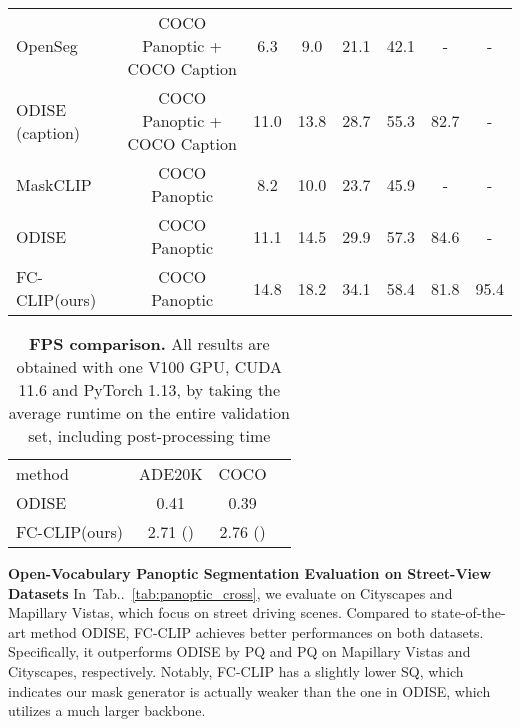 \documentclass{article}
\makeatletter
\DeclareRobustCommand\onedot{\futurelet\@let@token\@onedot}
\def\@onedot{\ifx\@let@token.\else.\null\fi\xspace}
\newcommand{\tabref}[1]{Tab\onedot~\ref{#1}}
\newcommand{\modelname}{FC-CLIP\xspace}
\newcommand{\tablestyle}[2]{\setlength{\tabcolsep}{#1}\renewcommand{\arraystretch}{#2}\centering\footnotesize}
\makeatother
\begin{document}
\begin{table*}[!t]
\begin{tabular}{l|c|cccccc}
\hline
OpenSeg~\cite{ghiasi2022scaling}      & COCO Panoptic + COCO Caption          & 6.3           & 9.0           & 21.1          & 42.1          & -         & -       \\
ODISE~\cite{xu2023open} (caption)        & COCO Panoptic + COCO Caption      & 11.0 & 13.8 & 28.7 & 55.3 & 82.7   & -  \\
\hline
MaskCLIP~\cite{ding2022open}       & COCO Panoptic              & 8.2           & 10.0          & 23.7          & 45.9          & -         & -     \\
ODISE~\cite{xu2023open}        & COCO Panoptic            & 11.1 & 14.5 & 29.9 & 57.3 & 84.6   & -  \\
\hline \hline
\modelname (ours)        & COCO Panoptic      & 14.8 & 18.2 & 34.1 & 58.4 & 81.8   & 95.4  \\
\end{tabular}

\end{table*}


\begin{table}[!t]
\tablestyle{6pt}{1.1}
\caption{
\textbf{FPS comparison.} All results are obtained with one V100 GPU, CUDA 11.6 and PyTorch 1.13, by taking the average runtime on the entire validation set, including post-processing time
}
\label{tab:fps_comp}

\begin{tabular}{l|ccc}
   method                    & ADE20K            & COCO            \\
   \shline
   ODISE~\cite{xu2023open} & 0.41 & 0.39   \\
   \hline \hline


   \modelname (ours)  & 2.71 () & 2.76 ()
\end{tabular}
\end{table}


\noindent \textbf{Open-Vocabulary Panoptic Segmentation Evaluation on Street-View Datasets}\quad
In~\tabref{tab:panoptic_cross}, we evaluate on Cityscapes and Mapillary Vistas, which focus on street driving scenes.
Compared to state-of-the-art method ODISE, \modelname achieves better performances on both datasets. Specifically, it outperforms ODISE by  PQ and  PQ on Mapillary Vistas and Cityscapes, respectively.
Notably, \modelname has a slightly lower SQ, which indicates our mask generator is actually weaker than the one in ODISE, which utilizes a much larger backbone.
\end{document}
